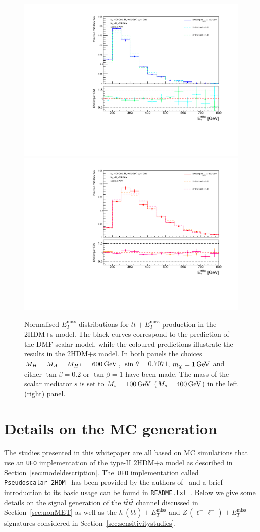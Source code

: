 \documentclass[a4paper, 11pt,notoc]{article}
\newcommand{\MET}{\ensuremath{E_T^\mathrm{miss}}\xspace}
\newcommand{\hdma}{\ensuremath{\textrm{2HDM+a}}\xspace}
\begin{document}
\begin{figure}
\centering
\includegraphics[width=.475\textwidth]{Met100GeV.pdf} \quad 
\includegraphics[width=.475\textwidth]{Met400GeV.pdf}
\vspace{2mm}
\caption{ Normalised $\MET$ distributions for $t \bar t + \MET$ production in the 2HDM+s model. The black curves correspond to the prediction of the DMF scalar   model, while the coloured predictions illustrate the results in the 2HDM+s  model. In both panels the choices $M_H = M_A = M_{H^\pm} = 600 \, {\rm GeV}$, $\sin \theta = 0.7071$, $m_\chi = 1 \, {\rm GeV}$ and either $\tan \beta = 0.2$ or $\tan \beta = 1$ have been made. The mass of the scalar mediator $s$ is set to $M_s = 100 \, {\rm GeV}$ ($M_s = 400 \, {\rm GeV}$) in the left (right) panel.}
\label{fig:ttMETscalar}
\end{figure}


\section{Details on the MC generation}
\label{app:mcgeneration}

The studies presented in this whitepaper are all based on MC simulations that use an {\tt UFO} implementation of the type-II \hdma model as described in Section~\ref{sec:modeldescription}. The~{\tt UFO} implementation  called {\tt Pseudoscalar\_2HDM}~\cite{hdmaUFO} has been provided by the authors of~\cite{Bauer:2017ota} and a brief introduction to its basic usage can be found in {\tt README.txt}~\cite{hdmaREADME}. Below we give some details on   the signal generation of the $t \bar t t \bar t$ channel discussed in Section~\ref{sec:nonMET} as well as  the $h \, (b \bar b) + \MET$ and $Z \, (\ell^+ \ell^-)+ \MET$ signatures  considered in Section~\ref{sec:sensitivitystudies}.
\end{document}
